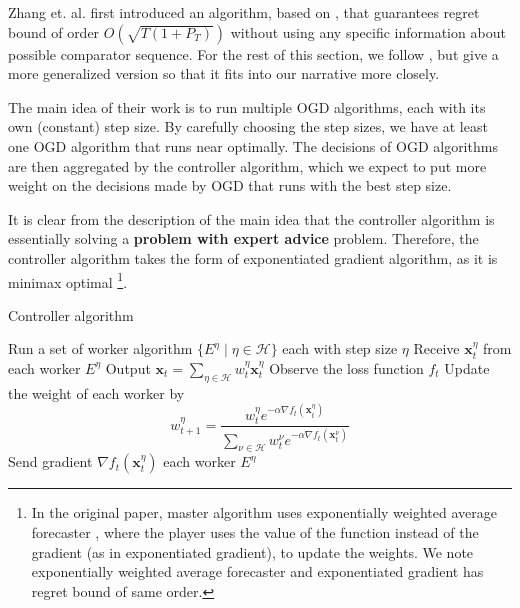 \documentclass[12pt, a4paper]{report}
\begin{document}
Zhang et. al. \cite{Zhang2018DynamicRO} first introduced an algorithm, based on  \cite{Erven2021MetaGradAU}, that guarantees regret bound of order $O(\sqrt{T(1 + P_T)})$ without using any specific information about possible comparator sequence. For the rest of this section, we follow \cite{Zhang2018DynamicRO}, but give a more generalized version so that it fits into our narrative more closely.

The main idea of their work is to run multiple OGD algorithms, each with its own (constant) step size. By carefully choosing the step sizes, we have at least one OGD algorithm that runs near optimally. The decisions of OGD algorithms are then aggregated by the controller algorithm, which we expect to put more weight on the decisions made by OGD that runs with the best step size. 

It is clear from the description of the main idea that the controller algorithm is essentially solving a \textbf{problem with expert advice} problem. Therefore, the controller algorithm takes the form of exponentiated gradient algorithm, as it is minimax optimal \footnote{In the original paper, master algorithm uses exponentially weighted average forecaster \cite{CesaBianchi2006PredictionLA}, where the player uses the value of the function instead of the gradient (as in exponentiated gradient), to update the weights. We note exponentially weighted average forecaster and exponentiated gradient has regret bound of same order.}.

\begin{algorithm}
\caption{Controller algorithm}\label{ader:controller}
\begin{algorithmic}[1]
\State Run a set of worker algorithm $\{E^{\eta} \mid \eta \in \mathcal{H} \}$ each with step size $\eta$ 
\State Receive $\mathbf{x}_t^{\eta}$ from each worker $E^{\eta}$
\State Output $\displaystyle \mathbf{x}_t = \sum_{\eta \in \mathcal{H}} w_{t}^{\eta} \mathbf{x}_t^{\eta}$
\State Observe the loss function $f_t$
\State Update the weight of each worker by \[
    w_{t+1}^{\eta} = \frac{w_t^{\eta}e^{-\alpha \nabla f_t(\mathbf{x}_t^{\eta})}}{\sum_{\nu \in \mathcal{H}}w_t^{\nu}e^{-\alpha \nabla f_t(\mathbf{x}_t^{\nu})}}
\]
\State Send gradient $\nabla f_t(\mathbf{x}_t^{\eta})$ each worker $E^{\eta}$ 
\EndFor
\end{algorithmic}
\end{algorithm}
\end{document}
